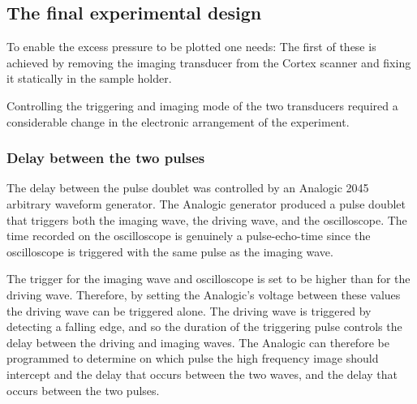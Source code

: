 

\subsection{The final experimental design} \label{sec:exp:finalDesign}

To enable the excess pressure to be plotted one needs:
The first of these is achieved by removing the imaging transducer from the Cortex scanner
and fixing it statically in the sample holder. %

Controlling the triggering and imaging mode of the two transducers 
required a considerable change in the electronic arrangement of the experiment.



\subsubsection{Delay between the two pulses}
The delay between the pulse doublet was controlled by
an Analogic 2045 arbitrary waveform generator.
The Analogic generator produced a pulse doublet that  triggers both the imaging wave, the driving wave, and the oscilloscope.
The time recorded on the oscilloscope is genuinely a pulse-echo-time since the oscilloscope is triggered with the same pulse as the imaging wave.

The trigger for the imaging wave and oscilloscope is set to be higher than for the driving wave.
Therefore, by setting the Analogic's voltage between these values
the driving wave can be triggered alone.
The driving wave is triggered by detecting a falling edge,
and so the duration of the triggering pulse controls the delay between the driving and imaging waves.
The Analogic can therefore be programmed to determine on which pulse the high frequency image should intercept
and the delay that occurs between the two waves, and the delay that occurs between the two pulses.


